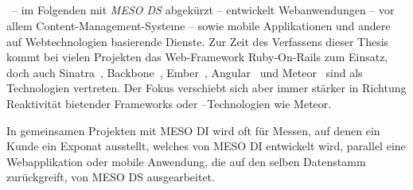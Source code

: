 \subsection{\mesods}
\label{ssec:em-meso-digital-services}

\mesods~-- im Folgenden mit \emph{MESO DS} abgekürzt -- entwickelt
Webanwendungen -- vor allem Content-Management-Systeme -- sowie mobile
Applikationen und andere auf Webtechnologien basierende Dienste.  Zur Zeit des
Verfassens dieser Thesis kommt bei vielen Projekten das Web-Framework
Ruby-On-Rails zum Einsatz, doch auch Sinatra~\cite{sinatra},
Backbone~\cite{backbone}, Ember~\cite{ember}, Angular~\cite{angular} und
Meteor~\cite{meteor} sind als Technologien vertreten.  Der Fokus verschiebt
sich aber immer stärker in Richtung Reaktivität bietender Frameworks oder
--Technologien wie Meteor.

In gemeinsamen Projekten mit MESO DI wird oft für Messen, auf
denen ein Kunde ein Exponat ausstellt, welches von MESO DI entwickelt wird,
parallel eine Webapplikation oder mobile Anwendung, die auf den selben
Datenstamm zurückgreift, von MESO DS ausgearbeitet.
